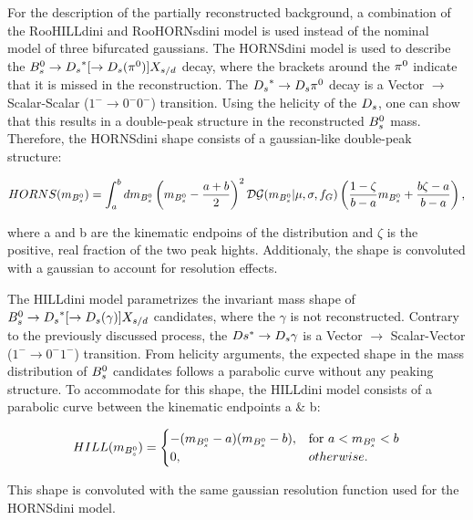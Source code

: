 For the description of the partially reconstructed background, 
a combination of the RooHILLdini and RooHORNsdini model \cite{Hill:2253246} is used instead of the nominal model of three bifurcated gaussians. 
The HORNSdini model is used to describe the ${{B}^0_{s}}\rightarrow{\ensuremath{{D}_{s}}}^{*}[\rightarrow{\ensuremath{{D}_{s}}}({{\pi}^0})] X_{s/d}$ decay, where the brackets around the ${{\pi}^0}$ indicate that it is missed in the reconstruction. 
The ${{D}_{s}}^{*}\rightarrow{\ensuremath{{D}_{s}}}{\ensuremath{{\pi}^0}}$ decay is a Vector $\to$ Scalar-Scalar ($1^{-}\to 0^{-}0^{-}$) transition. 
Using the helicity of the ${{D}_{s}}$, one can show that this results in a double-peak structure in the reconstructed ${{B}^0_{s}}$ mass. 
Therefore, the HORNSdini shape consists of a gaussian-like double-peak structure:

\begin{equation}
HORNS(m_{{{B}^0_{s}}}) = \int^{b}_{a} dm_{{{B}^0_{s}}}\left(m_{{{B}^0_{s}}} - \frac{a+b}{2} \right)^{2}\mathcal{DG}(m_{{{B}^0_{s}}}\vert\mu,\sigma,f_{G})\left(\frac{1-\zeta}{b-a}m_{{{B}^0_{s}}} + \frac{b\zeta - a}{b - a} \right),
\label{eq:HORNS}
\end{equation}

where a and b are the kinematic endpoins of the distribution and $\zeta$ is the positive, real fraction of the two peak hights. Additionaly, the shape is convoluted with a gaussian to account for resolution effects.

The HILLdini model parametrizes the invariant mass shape of ${{B}^0_{s}}\rightarrow{\ensuremath{{D}_{s}}}^{*}[\rightarrow{\ensuremath{{D}_{s}}}(\gamma)] X_{s/d}$ candidates, where the $\gamma$ is not reconstructed.
Contrary to the previously discussed process, the $Ds^{*}\rightarrow{\ensuremath{{D}_{s}}}\gamma$ is a Vector $\to$ Scalar-Vector ($1^{-} \to 0^{-} 1^{-}$) transition. 
From helicity arguments, the expected shape in the mass distribution of ${{B}^0_{s}}$ candidates follows a parabolic curve without any peaking structure.
To accommodate for this shape, the HILLdini model consists of a parabolic curve between the kinematic endpoints a \& b: 


\begin{equation}
HILL(m_{{{B}^0_{s}}}) = \begin{cases} -(m_{{{B}^0_{s}}} - a)(m_{{{B}^0_{s}}} - b),& \mbox{for } a < m_{{{B}^0_{s}}} < b \\
 0, &  otherwise. \end{cases}
\label{eq:HILLS}
 \end{equation}

This shape is convoluted with the same gaussian resolution function used for the HORNSdini model.


